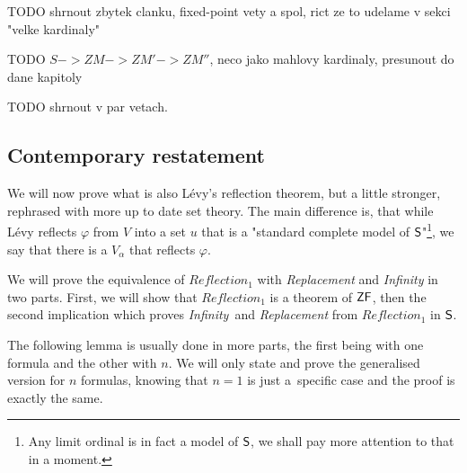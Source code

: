 \documentclass[12pt,a4paper]{article}
\begin{document}
TODO shrnout zbytek clanku, fixed-point vety a spol, rict ze to udelame v sekci "velke kardinaly"

TODO $S->ZM->ZM'->ZM''$, neco jako mahlovy kardinaly, presunout do dane kapitoly

TODO shrnout v par vetach.


\subsection{Contemporary restatement}
We will now prove what is also Lévy's reflection theorem, but a little stronger, rephrased with more up to date set theory. The main difference is, that while Lévy reflects $\varphi$ from $V$ into a set $u$ that is a "standard complete model of $\sf{S}$"\footnote{Any limit ordinal is in fact a model of $\sf{S}$, we shall pay more attention to that in a moment.}, we say that there is a $V_\alpha$ that reflects $\varphi$. 

We will prove the equivalence of \emph{$Reflection_1$} with \emph{Replacement} and \emph{Infinity} in two parts. First, we will show that \emph{$Reflection_1$} is a theorem of $\sf{ZF}$, then the second implication which proves \emph{Infinity} and \emph{Replacement} from \emph{$Reflection_1$} in $\sf{S}$.

The following lemma is usually done in more parts, the first being with one formula and the other with $n$. We will only state and prove the generalised version for $n$ formulas, knowing that $n=1$ is just a~specific case and the proof is exactly the same.
\end{document}
